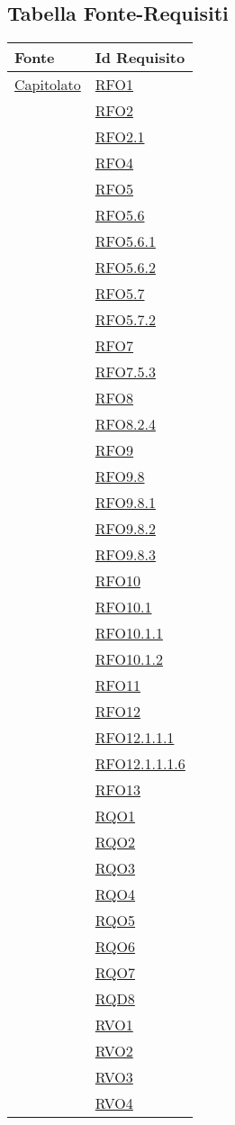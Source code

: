 \newpage
\subsection{Tabella Fonte-Requisiti}
\normalsize
\begin{longtable}{|>{\centering}m{5cm}|m{5cm}<{\centering}|}
\hline \rowcolor{Gray}
\textbf{Fonte} & \textbf{Id Requisito}\\
\hline
\endhead
\hyperlink{Capitolato}{Capitolato}
& \hyperlink{RFO1}{RFO1}\\
& \hyperlink{RFO2}{RFO2}\\
& \hyperlink{RFO2.1}{RFO2.1}\\
& \hyperlink{RFO4}{RFO4}\\
& \hyperlink{RFO5}{RFO5}\\
& \hyperlink{RFO5.6}{RFO5.6}\\
& \hyperlink{RFO5.6.1}{RFO5.6.1}\\
& \hyperlink{RFO5.6.2}{RFO5.6.2}\\
& \hyperlink{RFO5.7}{RFO5.7}\\
& \hyperlink{RFO5.7.2}{RFO5.7.2}\\
& \hyperlink{RFO7}{RFO7}\\
& \hyperlink{RFO7.5.3}{RFO7.5.3}\\
& \hyperlink{RFO8}{RFO8}\\
& \hyperlink{RFO8.2.4}{RFO8.2.4}\\
& \hyperlink{RFO9}{RFO9}\\
& \hyperlink{RFO9.8}{RFO9.8}\\
& \hyperlink{RFO9.8.1}{RFO9.8.1}\\
& \hyperlink{RFO9.8.2}{RFO9.8.2}\\
& \hyperlink{RFO9.8.3}{RFO9.8.3}\\
& \hyperlink{RFO10}{RFO10}\\
& \hyperlink{RFO10.1}{RFO10.1}\\
& \hyperlink{RFO10.1.1}{RFO10.1.1}\\
& \hyperlink{RFO10.1.2}{RFO10.1.2}\\
& \hyperlink{RFO11}{RFO11}\\
& \hyperlink{RFO12}{RFO12}\\
& \hyperlink{RFO12.1.1.1}{RFO12.1.1.1}\\
& \hyperlink{RFO12.1.1.1.6}{RFO12.1.1.1.6}\\
& \hyperlink{RFO13}{RFO13}\\
& \hyperlink{RQO1}{RQO1}\\
& \hyperlink{RQO2}{RQO2}\\
& \hyperlink{RQO3}{RQO3}\\
& \hyperlink{RQO4}{RQO4}\\
& \hyperlink{RQO5}{RQO5}\\
& \hyperlink{RQO6}{RQO6}\\
& \hyperlink{RQO7}{RQO7}\\
& \hyperlink{RQD8}{RQD8}\\
& \hyperlink{RVO1}{RVO1}\\
& \hyperlink{RVO2}{RVO2}\\
& \hyperlink{RVO3}{RVO3}\\
& \hyperlink{RVO4}{RVO4}\\


\end{longtable}
